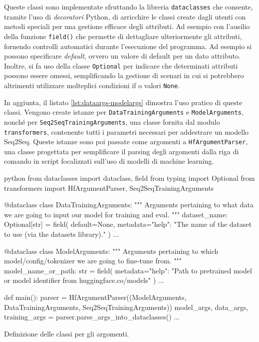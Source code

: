\documentclass[12pt,a4paper,twoside,openright]{book}
\begin{document}
Queste classi sono implementate sfruttando la libreria \texttt{dataclasses} che consente, tramite l'uso di \emph{decoratori} Python, di arricchire le classi create dagli utenti con metodi speciali per una gestione efficace degli attributi. Ad esempio con l'ausilio della funzione \texttt{field()} che permette di dettagliare ulteriormente gli attributi, fornendo controlli automatici durante l'esecuzione del programma. Ad esempio si possono specificare \emph{default}, ovvero un valore di default per un dato attributo. Inoltre, si fa uso della classe \texttt{Optional} per indicare che determinati attributi possono essere omessi, semplificando la gestione di scenari in cui si potrebbero altrimenti utilizzare molteplici condizioni if o valori \texttt{None}.

In aggiunta, il listato \ref{lst:dataargs-modelargs} dimostra l'uso pratico di queste classi. Vengono create istanze per \texttt{DataTrainingArguments} e \texttt{ModelArguments}, nonché per \texttt{Seq2SeqTrainingArguments}, una classe fornita dal modulo \texttt{transformers}, contenente tutti i parametri necessari per addestrare un modello Seq2Seq. Queste istanze sono poi passate come argomenti a \texttt{HfArgumentParser}, una classe progettata per semplificare il parsing degli argomenti dalla riga di comando in script focalizzati sull'uso di modelli di machine learning.

\begin{customcode}
\begin{mintedbox}{python}
from dataclasses import dataclass, field
from typing import Optional
from transformers import HfArgumentParser, Seq2SeqTrainingArguments

@dataclass
class DataTrainingArguments:
    """
    Arguments pertaining to what data we are going to input our model for training and eval.
    """
    dataset_name: Optional[str] = field(
        default=None, metadata={"help": "The name of the dataset to use (via the datasets library)."}
    )
    ... 

@dataclass
class ModelArguments:
    """
    Arguments pertaining to which model/config/tokenizer we are going to fine-tune from.
    """
    model_name_or_path: str = field(
        metadata={"help": "Path to pretrained model or model identifier from huggingface.co/models"}
    )
    ...

def main():
    parser = HfArgumentParser((ModelArguments, DataTrainingArguments, Seq2SeqTrainingArguments))
    model_args, data_args, training_args = parser.parse_args_into_dataclasses()
    ...
\end{mintedbox}
\caption{Definizione delle classi per gli argomenti.}
\label{lst:dataargs-modelargs}
\end{customcode}
\end{document}
